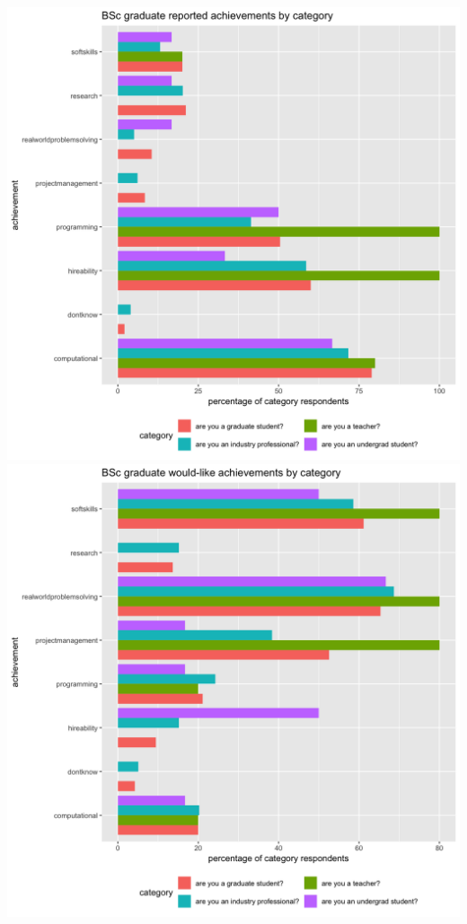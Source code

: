 \documentclass{sigchi}
\begin{document}
\includegraphics[scale=0.2]{../data-analysis/plots_output/BSc_graduate_reported_achievements_by_category.png}
\includegraphics[scale=0.2]{../data-analysis/plots_output/BSc_graduate_would-like_achievements_by_category.png}
\end{document}
